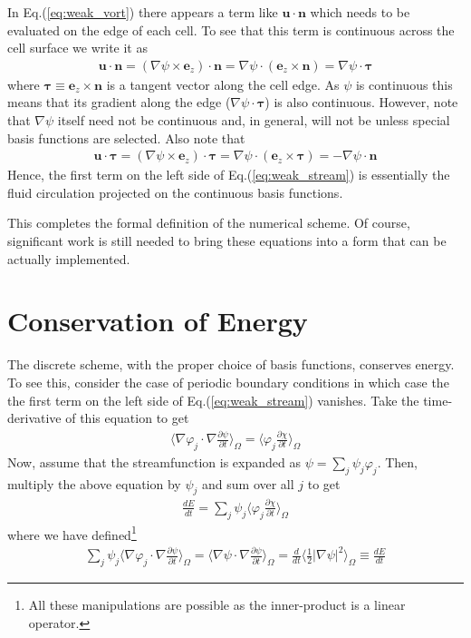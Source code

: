 \documentclass[11pt, reqno]{amsart}
\newcommand{\eqr}[1]{Eq.\thinspace(#1)}
\newcommand{\pfrac}[2]{\frac{\partial #1}{\partial #2}}
\newcommand{\mvec}[1]{\mathbf{#1}}
\newcommand{\gvec}[1]{\boldsymbol{#1}}
\newcommand{\eez}{\mvec{e}_z}
\newcommand{\iprod}[2]{\langle{#1}\rangle_{#2}}
\theoremstyle{definition}
\begin{document}
In \eqr{\ref{eq:weak_vort}} there appears a term like
$\mvec{u}\cdot\mvec{n}$ which needs to be evaluated on the edge of
each cell. To see that this term is continuous across the cell surface
we write it as
\begin{align}
  \mvec{u}\cdot\mvec{n}
  = (\nabla\psi\times \eez)\cdot\mvec{n}
  = \nabla\psi\cdot(\eez\times\mvec{n})
  = \nabla\psi\cdot\gvec{\tau}
\end{align}
where $\gvec{\tau} \equiv \eez\times\mvec{n}$ is a tangent vector
along the cell edge. As $\psi$ is continuous this means that its
gradient along the edge ($\nabla\psi\cdot\gvec{\tau}$) is also
continuous. However, note that $\nabla{\psi}$ itself need not be
continuous and, in general, will not be unless special basis functions
are selected. Also note that
\begin{align}
  \mvec{u}\cdot\gvec{\tau}
  = (\nabla\psi\times \eez)\cdot\gvec{\tau}
  = \nabla\psi\cdot(\eez\times\gvec{\tau})
  = -\nabla\psi\cdot\mvec{n}
\end{align}
Hence, the first term on the left side of \eqr{\ref{eq:weak_stream}}
is essentially the fluid circulation projected on the continuous basis
functions.

This completes the formal definition of the numerical scheme. Of
course, significant work is still needed to bring these equations into
a form that can be actually implemented.

\section{Conservation of Energy}

The discrete scheme, with the proper choice of basis functions,
conserves energy. To see this, consider the case of periodic boundary
conditions in which case the the first term on the left side of
\eqr{\ref{eq:weak_stream}} vanishes. Take the time-derivative of this
equation to get
\begin{align}
  \iprod{\nabla \varphi_j\cdot \nabla\pfrac{\psi}{t}}{\Omega}
  =
  \iprod{\varphi_j\pfrac{\chi}{t}}{\Omega}
\end{align}
Now, assume that the streamfunction is expanded as $\psi =
\sum_j\psi_j\varphi_j$. Then, multiply the above equation by $\psi_j$
and sum over all $j$ to get
\begin{align}
  \frac{dE}{dt}
  =
  \sum_j \psi_j \iprod{\varphi_j\pfrac{\chi}{t}}{\Omega}
\end{align}
where we have defined\footnote{All these manipulations are possible
  as the inner-product is a linear operator.}
\begin{align}
  \sum_j \psi_j \iprod{\nabla \varphi_j\cdot
    \nabla\pfrac{\psi}{t}}{\Omega}
  =
  \iprod{\nabla \psi\cdot \nabla\pfrac{\psi}{t}}{\Omega}  
  =
  \frac{d}{dt} \iprod{\frac{1}{2} |\nabla \psi|^2}{\Omega}
  \equiv
  \frac{dE}{dt}
\end{align}
\end{document}
